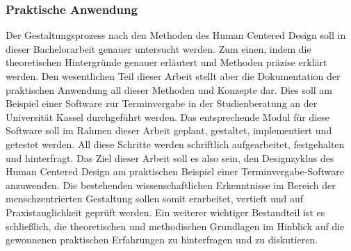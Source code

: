 \subsubsection{Praktische Anwendung}
Der Gestaltungsprozess nach den Methoden des Human Centered Design soll in
dieser Bachelorarbeit genauer untersucht werden. Zum einen, indem die
theoretischen Hintergründe genauer erläutert und Methoden präzise erklärt
werden. Den wesentlichen Teil dieser Arbeit stellt aber die Dokumentation der
praktischen Anwendung all dieser Methoden und Konzepte dar. Dies soll am
Beispiel einer Software zur Terminvergabe in der Studienberatung an der
Universität Kassel durchgeführt werden. Das entsprechende Modul für diese
Software soll im Rahmen dieser Arbeit geplant, gestaltet, implementiert und
getestet werden. All diese Schritte werden schriftlich aufgearbeitet,
festgehalten und hinterfragt. Das Ziel dieser Arbeit soll es also sein, den
Designzyklus des Human Centered Design am praktischen Beispiel einer
Terminvergabe-Software anzuwenden. Die bestehenden wissenschaftlichen
Erkenntnisse im Bereich der menschzentrierten Gestaltung sollen somit
erarbeitet, vertieft und auf Praxistauglichkeit geprüft werden. Ein weiterer
wichtiger Bestandteil ist es schließlich, die theoretischen und methodischen
Grundlagen im Hinblick auf die gewonnenen praktischen Erfahrungen zu
hinterfragen und zu diskutieren.

